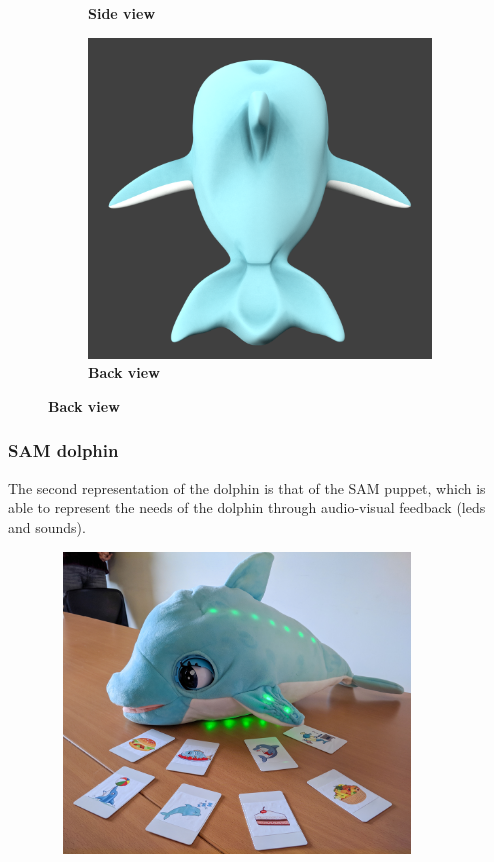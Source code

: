\documentclass [12pt]{article}
\begin{document}
\begin{figure}[h!]
\begin{subfigure}[tr]{0.3\linewidth}
\caption{\textbf{Side view}}
\end{subfigure}
\hspace*{\fill}
\begin{subfigure}[tr]{0.3\linewidth}
\includegraphics[width=\linewidth]{BackRender.png}
\caption{\textbf{Back view}}
\end{subfigure}
\hspace*{\fill}
\end{figure}
\subsubsection{SAM dolphin}
The second representation of the dolphin is that of the SAM puppet, which is able to represent the needs of the dolphin through audio-visual feedback (leds and sounds).  
 
\begin{figure}[ht!]
\centering
\includegraphics[height=8cm,width=10cm]{SamDolphin.jpg}
\end{figure}
\clearpage
\end{document}
